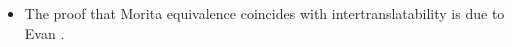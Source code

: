 \begin{itemize}
\item The proof that Morita equivalence coincides with
  intertranslatability is due to Evan \cite{evan}.

  
\end{itemize}








